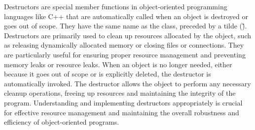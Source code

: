 Destructors are special member functions in object-oriented programming languages like C++ that are automatically called when an object is destroyed or goes out of scope. They have the same name as the class, preceded by a tilde (\~). Destructors are 
primarily used to clean up resources allocated by the object, such as releasing dynamically allocated memory or closing files or connections. They are particularly useful for ensuring proper resource management and preventing memory leaks or resource 
leaks. When an object is no longer needed, either because it goes out of scope or is explicitly deleted, the destructor is automatically invoked. The destructor allows the object to perform any necessary cleanup operations, freeing up resources and 
maintaining the integrity of the program. Understanding and implementing destructors appropriately is crucial for effective resource management and maintaining the overall robustness and efficiency of object-oriented programs.

